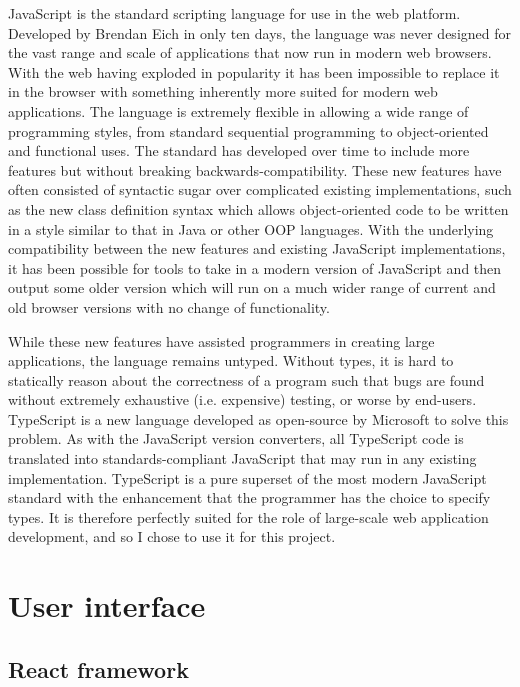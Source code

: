 JavaScript is the standard scripting language for use in the web platform. Developed by Brendan Eich in only ten days\cite{6155645}, the language was never designed for the vast range and scale of applications that now run in modern web browsers. With the web having exploded in popularity it has been impossible to replace it in the browser with something inherently more suited for modern web applications. The language is extremely flexible in allowing a wide range of programming styles, from standard sequential programming to object-oriented and functional uses. The standard has developed over time to include more features but without breaking backwards-compatibility. These new features have often consisted of syntactic sugar over complicated existing implementations, such as the new class definition syntax which allows object-oriented code to be written in a style similar to that in Java or other OOP languages. With the underlying compatibility between the new features and existing JavaScript implementations, it has been possible for tools to take in a modern version of JavaScript and then output some older version which will run on a much wider range of current and old browser versions with no change of functionality.

While these new features have assisted programmers in creating large applications, the language remains untyped. Without types, it is hard to statically reason about the correctness of a program such that bugs are found without extremely exhaustive (i.e. expensive) testing, or worse by end-users. TypeScript is a new language developed as open-source by Microsoft to solve this problem. As with the JavaScript version converters, all TypeScript code is translated into standards-compliant JavaScript that may run in any existing implementation. TypeScript is a pure superset of the most modern JavaScript standard with the enhancement that the programmer has the choice to specify types. It is therefore perfectly suited for the role of large-scale web application development, and so I chose to use it for this project.

\section{User interface}

\subsection{React framework}

